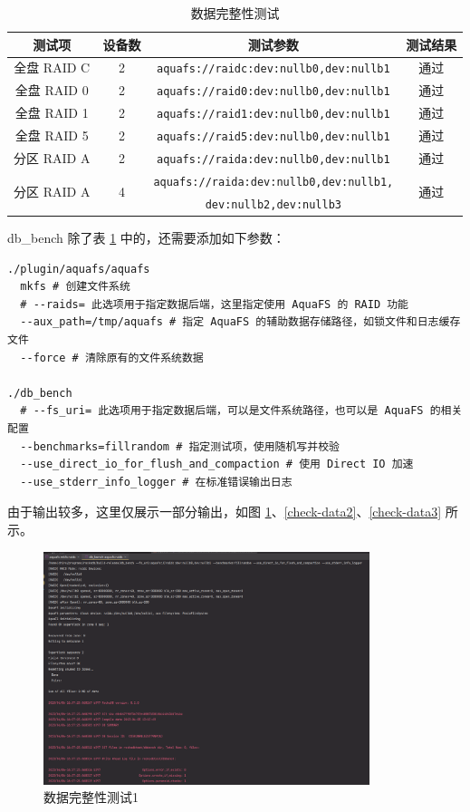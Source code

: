 \begin{table}[htbp]
  \centering
  \caption{数据完整性测试}
  \label{test-data}
  \begin{tabular}{cccc}
    \hline
    \textbf{测试项} & \textbf{设备数} & \textbf{测试参数} & \textbf{测试结果} \\
    \hline
    全盘 RAID C & 2 & \verb|aquafs://raidc:dev:nullb0,dev:nullb1| & 通过 \\
    全盘 RAID 0 & 2 & \verb|aquafs://raid0:dev:nullb0,dev:nullb1| & 通过 \\
    全盘 RAID 1 & 2 & \verb|aquafs://raid1:dev:nullb0,dev:nullb1| & 通过 \\
    全盘 RAID 5 & 2 & \verb|aquafs://raid5:dev:nullb0,dev:nullb1| & 通过 \\
    分区 RAID A & 2 & \verb|aquafs://raida:dev:nullb0,dev:nullb1| & 通过 \\
    \multirow{2}{*}{分区 RAID A} & \multirow{2}{*}{4} & \verb|aquafs://raida:dev:nullb0,dev:nullb1,| & \multirow{2}{*}{通过} \\
    & & \verb|dev:nullb2,dev:nullb3| & \\
    \hline
  \end{tabular}
\end{table}

db\_bench 除了表 \ref{test-data} 中的，还需要添加如下参数：

\begin{lstlisting}
./plugin/aquafs/aquafs
  mkfs # 创建文件系统
  # --raids= 此选项用于指定数据后端，这里指定使用 AquaFS 的 RAID 功能
  --aux_path=/tmp/aquafs # 指定 AquaFS 的辅助数据存储路径，如锁文件和日志缓存文件
  --force # 清除原有的文件系统数据

./db_bench 
  # --fs_uri= 此选项用于指定数据后端，可以是文件系统路径，也可以是 AquaFS 的相关配置
  --benchmarks=fillrandom # 指定测试项，使用随机写并校验
  --use_direct_io_for_flush_and_compaction # 使用 Direct IO 加速
  --use_stderr_info_logger # 在标准错误输出日志
\end{lstlisting}

由于输出较多，这里仅展示一部分输出，如图 \ref{check-data1}、\ref{check-data2}、\ref{check-data3} 所示。

\begin{figure}[htbp]
  \centering
  \includegraphics[width=0.85\textwidth]{fig/raid-data-check1}
  \caption{ 数据完整性测试1 }
  \label{check-data1}
\end{figure}

